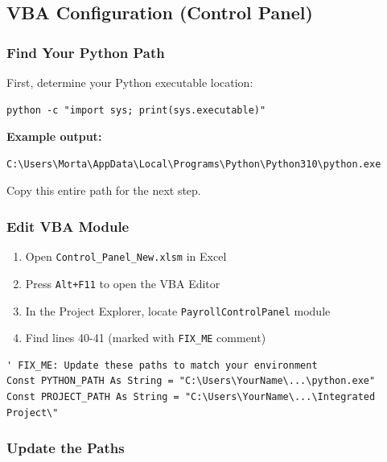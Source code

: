 \documentclass[11pt,a4paper]{article}
\begin{document}
\subsection{VBA Configuration (Control Panel)}

\subsubsection{Find Your Python Path}

First, determine your Python executable location:

\begin{commandbox}[title=Get Python Path]
\begin{lstlisting}[style=shellstyle]
python -c "import sys; print(sys.executable)"
\end{lstlisting}
\end{commandbox}

\textbf{Example output:}
\begin{lstlisting}[style=shellstyle, frame=none]
C:\Users\Morta\AppData\Local\Programs\Python\Python310\python.exe
\end{lstlisting}

Copy this entire path for the next step.

\subsubsection{Edit VBA Module}

\begin{enumerate}[leftmargin=*]
    \item Open \texttt{Control\_Panel\_New.xlsm} in Excel
    \item Press \texttt{Alt+F11} to open the VBA Editor
    \item In the Project Explorer, locate \texttt{PayrollControlPanel} module
    \item Find lines 40-41 (marked with \texttt{FIX\_ME} comment)
\end{enumerate}

\begin{lstlisting}[style=vbastyle, caption=VBA Configuration Lines 40-41]
' FIX_ME: Update these paths to match your environment
Const PYTHON_PATH As String = "C:\Users\YourName\...\python.exe"
Const PROJECT_PATH As String = "C:\Users\YourName\...\Integrated Project\"
\end{lstlisting}

\subsubsection{Update the Paths}
\end{document}

